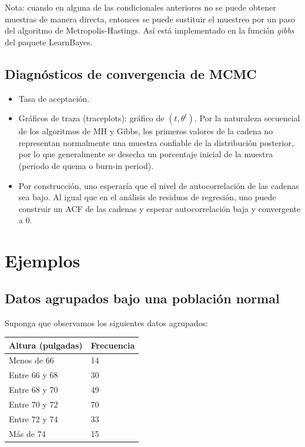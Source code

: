 \documentclass[
  12pt,
]{book}
\providecommand{\tightlist}{%
  \setlength{\itemsep}{0pt}\setlength{\parskip}{0pt}}
\theoremstyle{definition}
\theoremstyle{definition}
\theoremstyle{definition}
\theoremstyle{definition}
\theoremstyle{remark}
\begin{document}
Nota: cuando en alguna de las condicionales anteriores no se puede obtener muestras de manera directa, entonces se puede sustituir el muestreo por un paso del algoritmo de Metropolis-Hastings. Así está implementado en la función \emph{gibbs} del paquete LearnBayes.

\hypertarget{diagnuxf3sticos-de-convergencia-de-mcmc}{%
\subsection{Diagnósticos de convergencia de MCMC}\label{diagnuxf3sticos-de-convergencia-de-mcmc}}

\begin{itemize}
\tightlist
\item
  Tasa de aceptación.
\item
  Gráficos de traza (traceplots): gráfico de \((t,\theta^t)\). Por la naturaleza secuencial de los algoritmos de MH y Gibbs, los primeros valores de la cadena no representan normalmente una muestra confiable de la distribución posterior, por lo que generalmente se desecha un porcentaje inicial de la muestra (periodo de quema o burn-in period).
\item
  Por construcción, uno esperaría que el nivel de autocorrelación de las cadenas sea bajo. Al igual que en el análisis de residuos de regresión, uno puede construir un ACF de las cadenas y esperar autocorrelación baja y convergente a 0.
\end{itemize}

\hypertarget{ejemplos}{%
\section{Ejemplos}\label{ejemplos}}

\hypertarget{datos-agrupados-bajo-una-poblaciuxf3n-normal}{%
\subsection{Datos agrupados bajo una población normal}\label{datos-agrupados-bajo-una-poblaciuxf3n-normal}}

Suponga que observamos los siguientes datos agrupados:

\begin{longtable}[]{@{}ll@{}}
\toprule()
Altura (pulgadas) & Frecuencia \\
\midrule()
\endhead
Menos de 66 & 14 \\
Entre 66 y 68 & 30 \\
Entre 68 y 70 & 49 \\
Entre 70 y 72 & 70 \\
Entre 72 y 74 & 33 \\
Más de 74 & 15 \\
\bottomrule()
\end{longtable}
\end{document}

